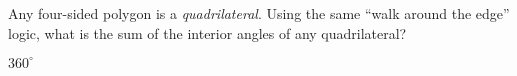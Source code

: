 \begin{Exercise}[title={Interior Angles of a Quadrilateral}, label=interior_of_quad]
  Any four-sided polygon is a \emph{quadrilateral}. Using the same
  ``walk around the edge'' logic, what is the sum of the interior
  angles of any quadrilateral?
\end{Exercise}
\begin{Answer}[ref=interior_of_quad]
$360^\circ$
\end{Answer}


